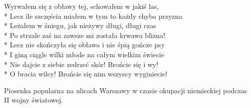 \begin{lyrics}[longestline={Bo z trzema naraz walczy psami i z ran trzech naraz krwawi.}]
\chorusref

Wyrwałem się z obławy tej, schowałem w jakiś las,\\*
Lecz ile szczęścia miałem w tym to każdy chyba przyzna\\*
Leżałem w śniegu, jak nieżywy długi, długi czas\\*
Po strzale zaś na zawsze mi została krwawa blizna!\\*
Lecz nie skończyła się obława i nie śpią gończe psy\\*
I giną ciągle wilki młode na całym wielkim świecie\\*
Nie dajcie z siebie zedrzeć skór! Brońcie się i wy!\\*
O bracia wilcy! Brońcie się nim wszyscy wyginiecie!

\chorusref
\end{lyrics}







\begin{info}Piosenka popularna na ulicach Warszawy w czasie okupacji niemieckiej podczas II wojny światowej.\end{info}

